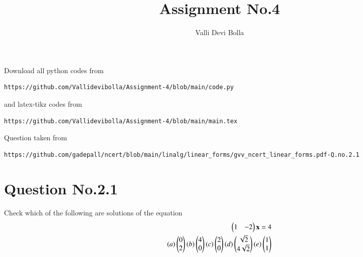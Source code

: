 \documentclass[journal,12pt,twocolumn]{IEEEtran}
\begin{document}
\def\rightbox#1{\makebox[0in][r]{#1}}
\def\centbox#1{\makebox[0in]{#1}}
\def\topbox#1{\raisebox{-\baselineskip}[0in][0in]{#1}}
\def\midbox#1{\raisebox{-0.5\baselineskip}[0in][0in]{#1}}
\vspace{3cm}
\title{Assignment No.4}
\author{Valli Devi Bolla}
\maketitle
\newpage
\bigskip
\renewcommand{\thefigure}{\theenumi}
\renewcommand{\thetable}{\theenumi}
Download all python codes from
\begin{lstlisting}
https://github.com/Vallidevibolla/Assignment-4/blob/main/code.py
\end{lstlisting}
%
and latex-tikz codes from
%
\begin{lstlisting}
https://github.com/Vallidevibolla/Assignment-4/blob/main/main.tex
\end{lstlisting}
%
Question taken from
\begin{lstlisting}
https://github.com/gadepall/ncert/blob/main/linalg/linear_forms/gvv_ncert_linear_forms.pdf-Q.no.2.1
\end{lstlisting}
%
\section{Question No.2.1}
Check which of the following are solutions of the equation
\begin{align}
\begin{pmatrix}1&-2\end{pmatrix}\mathbf{x}=4\\
(a)\begin{pmatrix}0\\2\end{pmatrix} (b)\begin{pmatrix}4\\0\end{pmatrix} (c)\begin{pmatrix}2\\0\end{pmatrix} (d)\begin{pmatrix}\sqrt{2}\\4\sqrt{2}\end{pmatrix} (e)\begin{pmatrix}1\\1\end{pmatrix}
\end{align}
\end{document}
